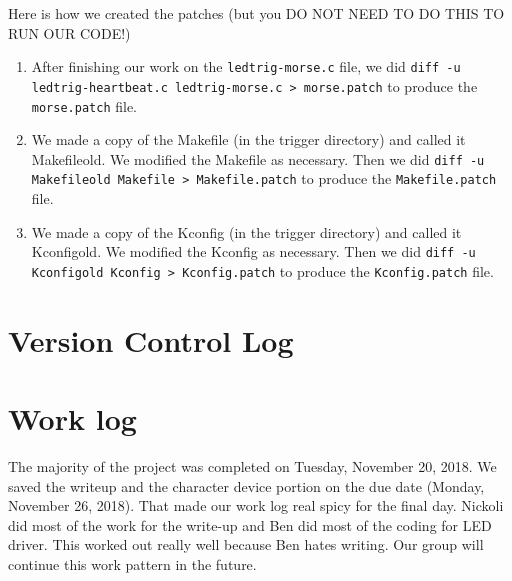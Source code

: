 \documentclass[10pt,english]{article}
\begin{document}
Here is how we created the patches (but you DO NOT NEED TO DO THIS TO RUN OUR CODE!)
\begin{enumerate}
\item After finishing our work on the \verb|ledtrig-morse.c| file, we did \verb|diff -u ledtrig-heartbeat.c ledtrig-morse.c > morse.patch| to produce the \verb|morse.patch| file. 
\item We made a copy of the Makefile (in the trigger directory) and called it Makefileold. We modified the Makefile as necessary. Then we did \verb|diff -u Makefileold Makefile > Makefile.patch| to produce the \verb|Makefile.patch| file.
\item We made a copy of the Kconfig (in the trigger directory) and called it Kconfigold. We modified the Kconfig as necessary. Then we did \verb|diff -u Kconfigold Kconfig > Kconfig.patch| to produce the \verb|Kconfig.patch| file.
\end{enumerate}



\section{Version Control Log}



\section{Work log}


The majority of the project was completed on Tuesday, November 20, 2018. We saved the writeup and the character device portion on the due date (Monday, November 26, 2018). That made our work log real spicy for the ﬁnal day. Nickoli did most of the work for the write-up and Ben did most of the coding for LED driver. This worked out really well because Ben hates writing. Our group will continue this work pattern in the future. 
\end{document}
